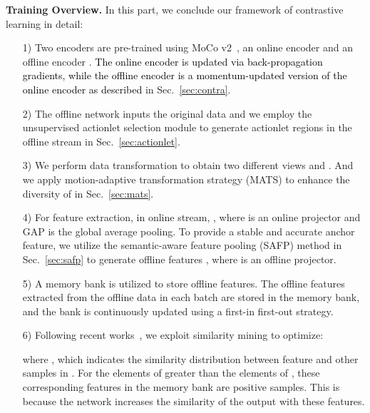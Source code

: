 \documentclass[twocolumn]{article}
\newcommand{\zjh}[1]{\textcolor{black}{#1}}
\begin{document}
\vspace{1mm}

\noindent\textbf{Training Overview.}
In this part, we conclude our framework of contrastive learning in detail: 
\begin{itemize}\setlength{\itemsep}{1.5pt} 
    \item[1)] Two encoders are pre-trained using MoCo v2~\cite{he2020momentum}, an online encoder  and an offline encoder .  \zjh{The online encoder is updated via back-propagation gradients, while the offline encoder is a momentum-updated version of the online encoder as described} in Sec.~\ref{sec:contra}.
    \item[2)] The offline network  inputs the original data  and we employ the unsupervised actionlet selection module to generate actionlet regions  in the offline stream in Sec.~\ref{sec:actionlet}.
    \item[3)] We perform data transformation  to obtain two different views  and . And we apply motion-adaptive transformation strategy (MATS) to enhance the diversity of  in Sec.~\ref{sec:mats}.
    \item[4)] For feature extraction, in online stream, , where  is an online projector and GAP is the global average pooling. To provide a stable and accurate anchor feature, we utilize the semantic-aware feature pooling (SAFP) method in Sec.~\ref{sec:safp} to generate offline features , where  is an offline projector. 
\item[5)]  A memory bank  is utilized to store offline features. The offline features extracted from the offline data in each batch are stored in the memory bank, and the bank is continuously updated using a first-in first-out strategy.
    \item[6)] Following recent works~\cite{mao2022cmd,zhang2022contrastive}, we exploit similarity mining to optimize:
    
    where , which indicates the similarity distribution between feature  and other samples in . For the elements  of  greater than the elements  of , these corresponding features  in the memory bank are positive samples. This is because the network increases the similarity of the output with these features.
\end{itemize}
\end{document}
